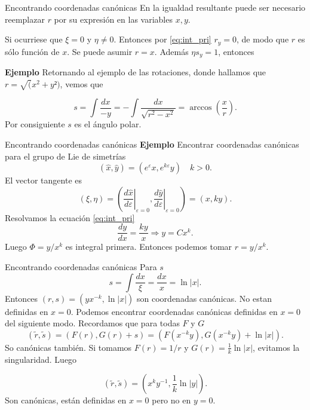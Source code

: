 \documentclass[handout,hyperref={colorlinks=true}]{beamer}
\renewcommand{\epsilon}{\varepsilon}
\begin{document}
\begin{frame}{Encontrando coordenadas canónicas}
En la igualdad resultante puede ser necesario reemplazar $r$ por su expresión en las variables $x,y$.


Si ocurriese que $\xi=0$ y $\eta\neq 0$. Entonces por \eqref{eq:int_pri} $r_y=0$, de modo que $r$ es sólo función de $x$. Se puede asumir $r=x$. Además $\eta s_y=1$, entonces


\textbf{Ejemplo} Retornando al ejemplo de las rotaciones, donde hallamos que $r=\sqrt(x^2+y²)$, vemos que

\[s=\int\frac{dx}{-y}=-\int\frac{dx}{\sqrt{r^2-x^2}}=\arccos\left(\frac{x}{r}\right).\]
Por consiguiente  $s$ es el ángulo polar.

\end{frame}



\begin{frame}{Encontrando coordenadas canónicas}\label{pag_ejem_canon1}
\textbf{Ejemplo} Encontrar coordenadas canónicas para el grupo de Lie de simetrías
\[(\hat{x},\hat{y})=(e^{\epsilon}x,e^{k\epsilon}y)\quad k>0.\]
El vector tangente es
\[(\xi,\eta)=\left(\left.\frac{d\hat{x}}{d\epsilon}\right|_{\epsilon=0},\left.\frac{d\hat{y}}{d\epsilon}\right|_{\epsilon=0}\right)=(x,ky).\]
Resolvamos la ecuación  \eqref{eq:int_pri} 
\[\frac{dy}{dx}=\frac{ky}{x}\Rightarrow y=Cx^k.\]
Luego $\Phi=y/x^k$ es integral primera. Entonces podemos tomar $r=y/x^k$. 




\end{frame}




\begin{frame}{Encontrando coordenadas canónicas}\label{pag_ejem_canon2}
 Para $s$
\[s=\int\frac{dx}{\xi}=\frac{dx}{x}=\ln|x|.\]
Entonces $(r,s)=(yx^{-k},\ln|x|)$ son coordenadas canónicas. No estan definidas en $x=0$.
Podemos encontrar coordenadas canónicas definidas en $x=0$ del siguiente modo. Recordamos que para todas $F$ y $G$
\[(\tilde{r},\tilde{s})=(F(r),G(r)+s)=(F(x^{-k}y),G(x^{-k}y)+\ln|x|).\]
So canónicas también. Si tomamos $F(r)=1/r$ y $G(r)=\frac{1}{k}\ln|x|$, evitamos la singularidad. Luego

\[(\tilde{r},\tilde{s})=(x^ky^{-1},\frac{1}{k}\ln|y|).\]
Son canónicas, están definidas en $x=0$ pero no en $y=0$.  






\end{frame}
\end{document}
